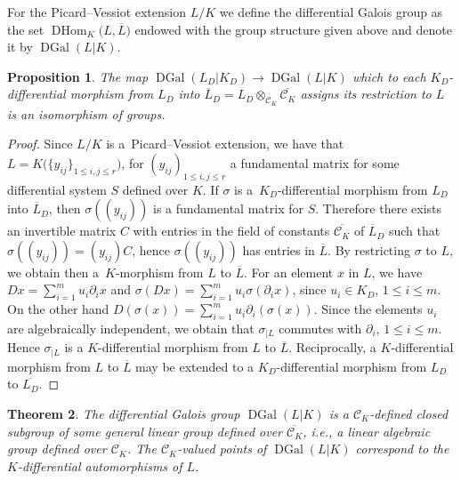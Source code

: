 \documentclass[10pt,a4paper]{amsart}
\numberwithin{equation}{section}
\newtheorem{Theorem}{Theorem}[section]
\newtheorem{Proposition}[Theorem]{Proposition}
 { \theoremstyle{definition}
\newtheorem{Definition}[Theorem]{Definition}
\newtheorem{Note}[Theorem]{Note}
\newtheorem{Example}[Theorem]{Example}
\newtheorem{examples}[Theorem]{Examples}
\newtheorem{Remark}[Theorem]{Remark} }
\def \DGal{\operatorname{DGal}}
\def \DHom{\operatorname{DHom}}
\begin{document}
\begin{Definition} For the Picard--Vessiot extension $L/K$ we define the differential Galois group as the set $\DHom_K\big(L,\overline{L}\big)$ endowed with the group structure given above and denote it by $\DGal(L|K)$.
\end{Definition}

\begin{Proposition}\label{groups}
The map $\DGal(L_D|K_D) \rightarrow \DGal(L|K)$ which to each
$K_D$-differential morphism from $L_D$ into $\overline{L}_D=L_D\otimes_{\mathcal{C}_K} \overline{\mathcal{C}_K}$
assigns its restriction to $L$ is an isomorphism of groups.
\end{Proposition}

\begin{proof} Since $L/K$ is a~Picard--Vessiot extension, we have that $L=K\big( \{y_{ij}\}_{1\leq i,j \leq r} \big)$, for $(y_{ij})_{1\leq i,j \leq r}$ a fundamental matrix for some differential system $S$ defined over $K$. If $\sigma$ is a~$K_D$-differential morphism from $L_D$ into
$\overline{L}_D$, then $\sigma((y_{ij}))$ is a fundamental matrix for $S$. Therefore there exists an invertible matrix $C$ with entries in the field of constants $\overline{\mathcal{C}_K}$ of $\overline{L}_D$ such that $\sigma((y_{ij}))=(y_{ij})C$, hence $\sigma((y_{ij}))$ has entries in $\overline{L}$. By restricting $\sigma$ to $L$, we obtain then a~$K$-morphism from $L$ to $\overline{L}$. For an element $x$ in $L$, we have $Dx=\sum_{i=1}^m u_i \partial_i x$ and $\sigma (Dx)=\sum_{i=1}^m u_i \sigma(\partial_i x)$, since $u_i \in K_D$, $1\leq i \leq m$. On the other hand $D(\sigma(x))=\sum_{i=1}^m u_i \partial_i (\sigma (x))$. Since the elements $u_i$ are algebraically independent, we obtain that $\sigma_{|L}$ commutes with $\partial_i$, $1 \leq i \leq m$. Hence $\sigma_{|L}$ is a $K$-differential morphism from $L$ to $\overline{L}$. Reciprocally, a $K$-differential morphism from $L$ to $\overline{L}$ may be extended to a $K_D$-differential morphism from $L_D$ to $\overline{L_D}$.
\end{proof}

\begin{Theorem}
The differential Galois group $\DGal(L|K)$ is a $\mathcal{C}_K$-defined closed subgroup of some general linear group defined over $\overline{\mathcal{C}_K}$, i.e., a linear algebraic group defined over $\mathcal{C}_K$. The $\mathcal{C}_K$-valued points of $\DGal(L|K)$ correspond to the $K$-differential automorphisms of $L$.
\end{Theorem}
\end{document}
